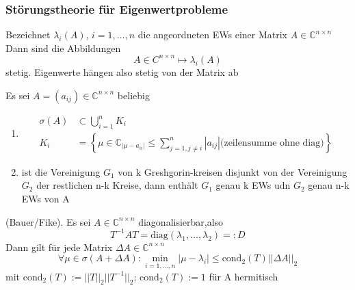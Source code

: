 \documentclass[
	ngerman,
	accentcolor=9c,%
	type=intern,
	marginpar=false
	]{tudapub}
\begin{document}
            \subsubsection{Störungstheorie für Eigenwertprobleme}
                \begin{satz}
                    Bezeichnet $\lambda_i(A)$, $i = 1, \dots, n$ die angeordneten EWs einer Matrix $A \in \mathbb{C}^{n\times n}$
                    Dann sind die Abbildungen 
                    \begin{equation*}
                        A \in C^{n\times n} \mapsto \lambda_i (A)
                    \end{equation*}
                    stetig. Eigenwerte hängen also stetig von der Matrix ab
                \end{satz}
                \begin{satz}
                    Es sei $A= (a_{ij}) \in \mathbb{C}^{n\times n}$ beliebig
                    \begin{enumerate}[label=\alph*)]
                        \item \begin{align*}
                            \sigma(A) &\subset \bigcup_{i=1}^n K_i\\
                            K_i &= \left\{\mu \in \mathbb{C}_ |\mu - a_{ii}| \leq \sum_{j = 1, j \not = i}^n|a_{ij}|\text{(zeilensumme ohne diag)}\right\}
                        \end{align*}
                        \item ist die Vereinigung $G_1$ von k Greshgorin-kreisen disjunkt von der Vereinigung $G_2$ der restlichen
                        n-k Kreise, dann enthält $G_1$ genau k EWs udn $G_2$ genau n-k EWs von A
                    \end{enumerate}
                \end{satz}
                \begin{satz}
                    (Bauer/Fike). Es sei $A \in \mathbb{C}^{n \times n}$ diagonalisierbar,also
                    \begin{equation*}
                        T^{-1}AT = \text{diag}(\lambda_1, \dots, \lambda_2) =: D
                    \end{equation*}
                    Dann gilt für jede Matrix $\Delta A \in \mathbb{C}^{n \times n}$
                    \begin{equation*}
                        \forall \mu \in \sigma(A+\Delta A): \min_{i=1,\dots,n} |\mu - \lambda_i| \leq \text{cond}_2(T)||\Delta A||_2
                    \end{equation*}
                    mit $\text{cond}_2(T):= ||T||_2||T^{-1}||_2$; $\text{cond}_2(T):= 1$ für A hermitisch 
                \end{satz}
\end{document}
